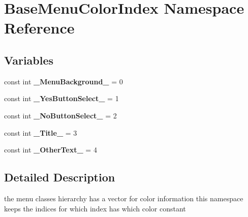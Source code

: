 \hypertarget{namespace_base_menu_color_index}{}\section{Base\+Menu\+Color\+Index Namespace Reference}
\label{namespace_base_menu_color_index}
\subsection*{Variables}
\begin{DoxyCompactItemize}
\item 
\hypertarget{namespace_base_menu_color_index_abd8c272dac8688636684f7c021ecbe21}{}\label{namespace_base_menu_color_index_abd8c272dac8688636684f7c021ecbe21} 
const int {\bfseries \+\_\+\+Menu\+Background\+\_\+} = 0
\item 
\hypertarget{namespace_base_menu_color_index_a970c811416f3f2d80192dc0f22493d63}{}\label{namespace_base_menu_color_index_a970c811416f3f2d80192dc0f22493d63} 
const int {\bfseries \+\_\+\+Yes\+Button\+Select\+\_\+} = 1
\item 
\hypertarget{namespace_base_menu_color_index_a6614ec9cc358cc44f30adbe6c50ae59f}{}\label{namespace_base_menu_color_index_a6614ec9cc358cc44f30adbe6c50ae59f} 
const int {\bfseries \+\_\+\+No\+Button\+Select\+\_\+} = 2
\item 
\hypertarget{namespace_base_menu_color_index_aef35d9d3b2f7bdacc9bd67be93779101}{}\label{namespace_base_menu_color_index_aef35d9d3b2f7bdacc9bd67be93779101} 
const int {\bfseries \+\_\+\+Title\+\_\+} = 3
\item 
\hypertarget{namespace_base_menu_color_index_a00892e91c5696d84522744278d3e00c8}{}\label{namespace_base_menu_color_index_a00892e91c5696d84522744278d3e00c8} 
const int {\bfseries \+\_\+\+Other\+Text\+\_\+} = 4
\end{DoxyCompactItemize}


\subsection{Detailed Description}
the menu classes hierarchy has a vector for color information this namespace keeps the indices for which index has which color constant 